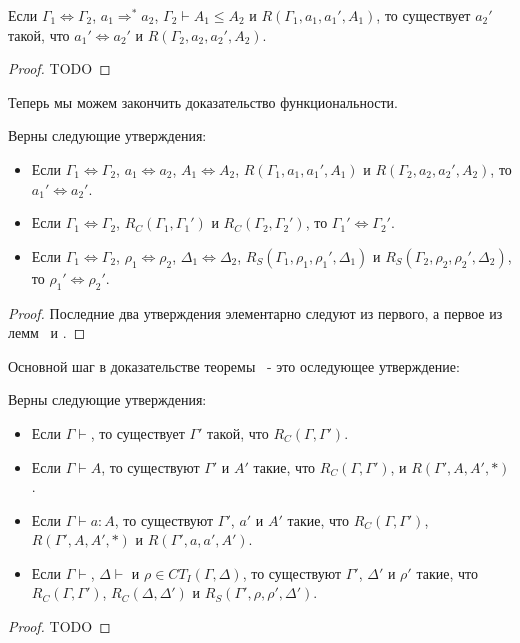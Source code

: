 \documentclass{amsart}
\theoremstyle{definition}
\theoremstyle{remark}
\newcommand{\red}{\Rightarrow}
\newcommand{\deq}{\Leftrightarrow}
\numberwithin{figure}{section}
\begin{document}
\begin{lem}
Если $\Gamma_1 \deq \Gamma_2$, $a_1 \red^* a_2$, $\Gamma_2 \vdash A_1 \leq A_2$ и $R(\Gamma_1, a_1, a_1', A_1)$, то существует $a_2'$ такой, что $a_1' \deq a_2'$ и $R(\Gamma_2, a_2, a_2', A_2)$.
\end{lem}
\begin{proof}
TODO
\end{proof}

Теперь мы можем закончить доказательство функциональности.
\begin{prop}
Верны следующие утверждения:
\begin{itemize}
\item Если $\Gamma_1 \deq \Gamma_2$, $a_1 \deq a_2$, $A_1 \deq A_2$, $R(\Gamma_1, a_1, a_1', A_1)$ и $R(\Gamma_2, a_2, a_2', A_2)$, то $a_1' \deq a_2'$.
\item Если $\Gamma_1 \deq \Gamma_2$, $R_C(\Gamma_1, \Gamma_1')$ и $R_C(\Gamma_2, \Gamma_2')$, то $\Gamma_1' \deq \Gamma_2'$.
\item Если $\Gamma_1 \deq \Gamma_2$, $\rho_1 \deq \rho_2$, $\Delta_1 \deq \Delta_2$, $R_S(\Gamma_1, \rho_1, \rho_1', \Delta_1)$ и $R_S(\Gamma_2, \rho_2, \rho_2', \Delta_2)$, то $\rho_1' \deq \rho_2'$.
\end{itemize}
\end{prop}
\begin{proof}
Последние два утверждения элементарно следуют из первого, а первое из лемм~ и .
\end{proof}

Основной шаг в доказательстве теоремы~ - это оследующее утверждение:
\begin{prop}
Верны следующие утверждения:
\begin{itemize}
\item Если $\Gamma \vdash$, то существует $\Gamma'$ такой, что $R_C(\Gamma, \Gamma')$.
\item Если $\Gamma \vdash A$, то существуют $\Gamma'$ и $A'$ такие, что $R_C(\Gamma, \Gamma')$, и $R(\Gamma', A, A', *)$.
\item Если $\Gamma \vdash a : A$, то существуют $\Gamma'$, $a'$ и $A'$ такие, что $R_C(\Gamma, \Gamma')$, $R(\Gamma', A, A', *)$ и $R(\Gamma', a, a', A')$.
\item Если $\Gamma \vdash$, $\Delta \vdash$ и $\rho \in CT_I(\Gamma, \Delta)$, то существуют $\Gamma'$, $\Delta'$ и $\rho'$ такие, что $R_C(\Gamma, \Gamma')$, $R_C(\Delta, \Delta')$ и $R_S(\Gamma', \rho, \rho', \Delta')$.
\end{itemize}
\end{prop}
\begin{proof}
TODO
\end{proof}
\end{document}
